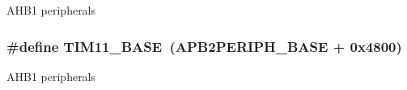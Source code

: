 A\-H\-B1 peripherals \hypertarget{group___peripheral__memory__map_ga3a4a06bb84c703084f0509e105ffaf1d}{
\subsubsection[{T\-I\-M11\-\_\-\-B\-A\-S\-E}]{\setlength{\rightskip}{0pt plus 5cm}\#define T\-I\-M11\-\_\-\-B\-A\-S\-E~(A\-P\-B2\-P\-E\-R\-I\-P\-H\-\_\-\-B\-A\-S\-E + 0x4800)}}\label{group___peripheral__memory__map_ga3a4a06bb84c703084f0509e105ffaf1d}
A\-H\-B1 peripherals 
